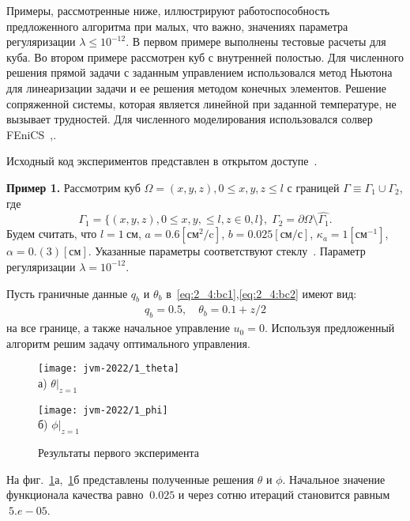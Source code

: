Примеры, рассмотренные ниже, иллюстрируют работоспособность предложенного алгоритма при
малых, что важно, значениях параметра регуляризации $\lambda \leq 10^{-12}$.
В первом примере выполнены тестовые расчеты для куба.
Во втором примере рассмотрен куб с внутренней полостью.
Для численного решения прямой задачи с заданным управлением использовался
метод Ньютона для линеаризации задачи и ее решения методом конечных элементов.
Решение сопряженной системы, которая является линейной
при заданной температуре, не вызывает трудностей.
Для численного моделирования использовался солвер FEniCS~\cite{fenics},\cite{dolfin}.

Исходный код экспериментов представлен в открытом доступе~\cite{mesenev-github}.

\textbf{Пример 1.}
Рассмотрим куб $\Omega = {(x, y, z), 0 \leq x,y,z \leq l}$ с границей
$\Gamma \equiv \Gamma_1 \cup \Gamma_2$, где
\[
    \Gamma_1 = \{(x, y, z), 0 \leq x,y, \leq l, z \in 0, l\}, \;
    \Gamma_2 = \partial \Omega \setminus \hat{\Gamma_1}.
\]
Будем считать, что
$l = 1~\text{см}$,
$a = 0.6[\text{см}^2/\text{c}]$,
$b = 0.025[\text{см}/\text{с}]$,
$\kappa_a = 1[\text{см}^{-1}]$,
$\alpha = 0.(3)[\text{см}]$.
Указанные параметры соответствуют стеклу~\cite{Grenkin2016a}.
Параметр регуляризации $\lambda=10^{-12}$.

Пусть граничные данные $q_b$ и $\theta_b$ в~\eqref{eq:2_4:bc1},\eqref{eq:2_4:bc2} имеют вид:
\begin{gather*}
    q_b = 0.5, \quad
    \theta_b = 0.1 + z/2
\end{gather*}
на все границе, а также начальное управление $u_0 = 0$.
Используя предложенный алгоритм решим задачу оптимального управления.

\begin{figure}[h!t]
    \begin{minipage}[b][][b]{0.49\linewidth}
        \centering
        \texttt{[image: jvm-2022/1\_theta]}
        \\ а) $\theta|_{z=1}$
    \end{minipage}
    \hfill
    \begin{minipage}[b][][b]{0.49\linewidth}
        \centering
        \texttt{[image: jvm-2022/1\_phi]}
        \\ б) $\phi|_{z=1}$
    \end{minipage}
    \caption{Результаты первого эксперимента}
    \label{fig:4_4:5}
\end{figure}

На фиг.~\ref{fig:4_4:5}а,~\ref{fig:4_4:5}б представлены
полученные решения $\theta$ и $\phi$.
Начальное значение функционала качества равно $~0.025$ и
через сотню итераций становится равным $~5.e-05$.


